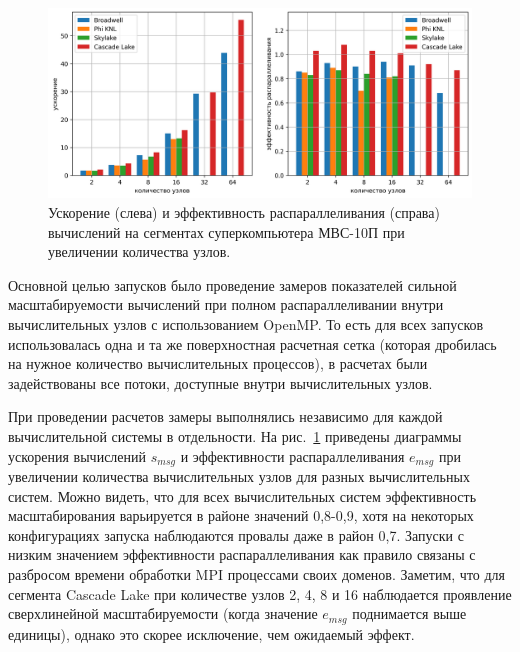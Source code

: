 \begin{figure}[ht]
\centering
\includegraphics[width=1.0\textwidth]{fig/par_surf_2in1.png}
\singlespacing
{}\caption{Ускорение (слева) и эффективность распараллеливания (справа) вычислений на сегментах суперкомпьютера МВС-10П при увеличении количества узлов.}
\label{fig:text_2_scaling_speedup_eff}
\end{figure}

Основной целью запусков было проведение замеров показателей сильной масштабируемости вычислений при полном распараллеливании внутри вычислительных узлов с использованием OpenMP.
То есть для всех запусков использовалась одна и та же поверхностная расчетная сетка (которая дробилась на нужное количество вычислительных процессов), в расчетах были задействованы все потоки, доступные внутри вычислительных узлов.

При проведении расчетов замеры выполнялись независимо для каждой вычислительной системы в отдельности.
На рис.~\ref{fig:text_2_scaling_speedup_eff} приведены диаграммы ускорения вычислений $s_{msg}$ и эффективности распараллеливания $e_{msg}$ при увеличении количества вычислительных узлов для разных вычислительных систем.
Можно видеть, что для всех вычислительных систем эффективность масштабирования варьируется в районе значений 0,8-0,9, хотя на некоторых конфигурациях запуска наблюдаются провалы даже в район 0,7.
Запуски с низким значением эффективности распараллеливания как правило связаны с разбросом времени обработки MPI\label{abbr:mpi-6} процессами своих доменов.
Заметим, что для сегмента Cascade Lake при количестве узлов 2, 4, 8 и 16 наблюдается проявление сверхлинейной масштабируемости (когда значение $e_{msg}$ поднимается выше единицы), однако это скорее исключение, чем ожидаемый эффект.



